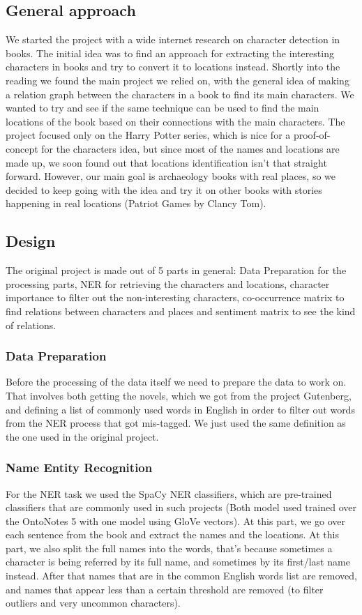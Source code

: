 \documentclass{article}
\begin{document}
\subsection{General approach}
We started the project with a wide internet research on character detection in books. The initial idea was to find an approach for extracting the interesting characters in books and try to convert it to locations instead.\newline
Shortly into the reading we found the main project we relied on, with the general idea of making a relation graph between the characters in a book to find its main characters. We wanted to try and see if the same technique can be used to find the main locations of the book based on their connections with the main characters.\newline
The project focused only on the Harry Potter series, which is nice for a proof-of-concept for the characters idea, but since most of the names and locations are made up, we soon found out that locations identification isn't that straight forward. However, our main goal is archaeology books with real places, so we decided to keep going with the idea and try it on other books with stories happening in real locations (Patriot Games by Clancy Tom).

\subsection{Design}
The original project is made out of 5 parts in general: Data Preparation for the processing parts, NER for retrieving the characters and locations, character importance to filter out the non-interesting characters, co-occurrence matrix to find relations between characters and places and sentiment matrix to see the kind of relations.
\subsubsection{Data Preparation}
Before the processing of the data itself we need to prepare the data to work on. That involves both getting the novels, which we got from the project Gutenberg\cite{projectgutenberg}, and defining a list of commonly used words in English in order to filter out words from the NER process that got mis-tagged. We just used the same definition as the one used in the original project.
\subsubsection{Name Entity Recognition}
For the NER task we used the SpaCy NER classifiers\cite{spacy}, which are pre-trained classifiers that are commonly used in such projects (Both model used trained over the OntoNotes 5\cite{ontonotes} with one model using GloVe vectors). At this part, we go over each sentence from the book and extract the names and the locations. At this part, we also split the full names into the words, that's because sometimes a character is being referred by its full name, and sometimes by its first/last name instead. After that names that are in the common English words list are removed, and names that appear less than a certain threshold are removed (to filter outliers and very uncommon characters).
\end{document}
